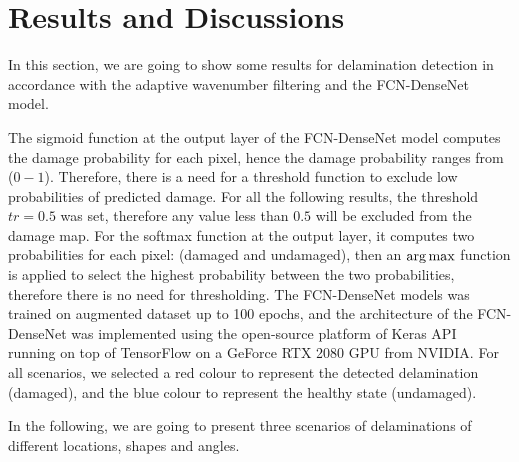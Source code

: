 \section{Results and Discussions}
In this section, we are going to show some results for delamination detection in accordance with the adaptive wavenumber filtering and the FCN-DenseNet model. 
	
The sigmoid function at the output layer of the FCN-DenseNet model computes the damage probability for each pixel, hence the damage probability ranges from (\(0 - 1\)).
Therefore, there is a need for a threshold function to exclude low probabilities of predicted damage. 
For all the following results, the threshold \(tr = 0.5\) was set, therefore any value less than \(0.5\) will be excluded from the damage map.
For the softmax function at the output layer, it computes two probabilities for each pixel: (damaged and undamaged), then an \(\operatorname*{arg\,max}\) function is applied to select the highest probability between the two probabilities, therefore there is no need for thresholding. 
The FCN-DenseNet models was trained on augmented dataset up to 100 epochs, and the architecture of the FCN-DenseNet  was implemented using the open-source platform of Keras API~\cite{chollet2015keras} running on top of TensorFlow on a GeForce RTX 2080  GPU from NVIDIA.
For all scenarios, we selected a red colour to represent the detected delamination (damaged), and the blue colour to represent the healthy state (undamaged).
	
In the following, we are going to present three scenarios of delaminations of different locations, shapes and angles.

